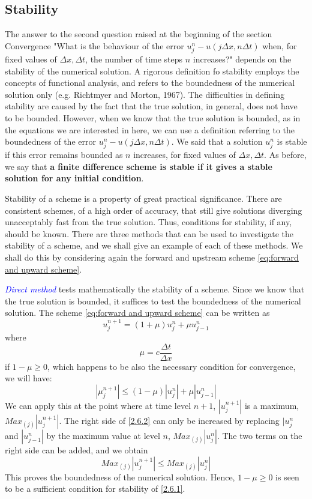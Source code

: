 \subsection{Stability}
The answer to the second question raised at the beginning of the section Convergence "What is the behaviour of the error $u_j^n-u(j\Delta x, n\Delta t)$ when, for fixed values of $\Delta x, \Delta t$, the number of time steps $n$ increases?" depends on the stability of the numerical solution. A rigorous definition fo stability employs the concepts of functional analysis, and refers to the boundedness of the numerical solution only (e.g. Richtmyer and Morton, 1967). The difficulties in defining stability are caused by the fact that the true solution, in general, does not have to be bounded. However, when we know that the true solution is bounded, as in the equations we are interested in here, we can use a definition referring to the boundedness of the error $u_j^n-u(j\Delta x, n\Delta t)$. We said that a solution $u_j^n$ is stable if this error remains bounded as $n$ increases, for fixed values of $\Delta x, \Delta t$. As before, we say that \textbf{a finite difference scheme is stable if it gives a stable solution for any initial condition}.

Stability of a scheme is a property of great practical significance. There are consistent schemes, of a high order of accuracy, that still give solutions diverging unacceptably fast from the true solution. Thus, conditions for stability, if any, should be known. There are three methods that can be used to investigate the stability of a scheme, and we shall give an example of each of these methods. We shall do this by considering again the forward and upstream scheme \ref{eq:forward and upward scheme}.


\textcolor{Blue}{\textit{Direct method}} tests mathematically the stability of a scheme. Since we know that the true solution is bounded, it suffices to test the boundedness of the numerical solution. The scheme \ref{eq:forward and upward scheme} can be written as
\begin{equation}\label{2.6.1}
	u_j^{n+1}=(1+\mu)u_j^n+\mu u^n_{j-1}
\end{equation}
where
$$\mu=c\frac{\Delta t}{\Delta x}$$
if $1-\mu\geq 0$, which happens to be also the necessary condition for convergence, we will have:
\begin{equation}\label{2.6.2}
	|\mu_j^{n+1}|\leq(1-\mu)|u_j^n|+\mu|u^n_{j-1}|
\end{equation}
We can apply this at the point where at time level $n+1$, $|u_j^{n+1}|$ is a maximum, $Max_{(j)}|u_j^{n+1}|$. The right side of \ref{2.6.2} can only be increased by replacing $|u_j^n$ and $|u_{j-1}^n|$ by the maximum value at level $n$, $Max_{(j)}|u_j^n|$. The two terms on the right side can be added, and we obtain
$$Max_{(j)}|u_j^{n+1}|\leq Max_{(j)}|u_j^n|$$
This proves the boundedness of the numerical solution. Hence, $1-\mu\geq 0$ is seen to be a sufficient condition for stability of \ref{2.6.1}.


